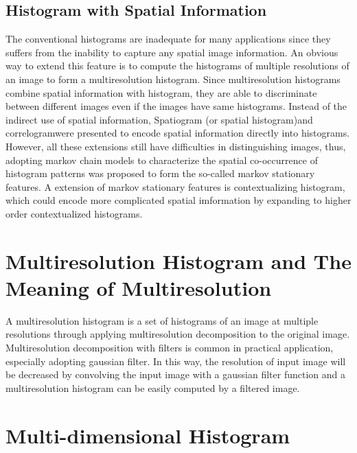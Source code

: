 \documentclass{article}
\begin{document}
\subsection{Histogram with Spatial Information}
The conventional histograms are inadequate for many applications since they suffers from the inability to capture any spatial image information. An obvious way to extend this feature is to compute the histograms of multiple resolutions of an image to form a multiresolution histogram. Since multiresolution histograms combine spatial information with histogram, they are able to discriminate between different images even if the images have same histograms\cite{Hadjidemetriou2001,Hadjidemetriou2004}. Instead of the indirect use of spatial information, Spatiogram (or spatial histogram)\cite{Birchfield2005}and correlogram\cite{Huang}were presented to encode spatial information directly into histograms. However, all these extensions still have difficulties in distinguishing images, thus, adopting markov chain models to characterize the spatial co-occurrence of histogram patterns was proposed to form the so-called markov stationary features\cite{Li2008}. A extension of markov stationary features is contextualizing histogram, which could encode more complicated spatial imformation by expanding to higher order contextualized histograms\cite{Kassim2009,Feng2012}. 
\section{Multiresolution Histogram and The Meaning of Multiresolution}
A multiresolution histogram is a set of histograms of an image at multiple resolutions through applying multiresolution decomposition to the original image. Multiresolution decomposition with filters is common in practical application, especially adopting gaussian filter. In this way, the resolution of input image will be decreased by convolving the input image with a gaussian filter function and a multiresolution histogram can be easily computed by a filtered image.
\section{Multi-dimensional Histogram}


\end{document}
